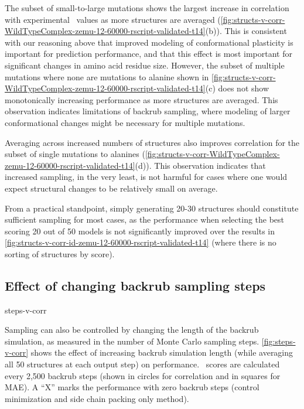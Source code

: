 The subset of small-to-large mutations shows the largest increase in correlation with experimental \ddg\ values as more structures are averaged (\cref{fig:structs-v-corr-WildTypeComplex-zemu-12-60000-rscript-validated-t14}(b)). This is consistent with our reasoning above that improved modeling of conformational plasticity is important for prediction performance, and that this effect is most important for significant changes in amino acid residue size. However, the subset of multiple mutations where none are mutations to alanine shown in \cref{fig:structs-v-corr-WildTypeComplex-zemu-12-60000-rscript-validated-t14}(c) does not show monotonically increasing performance as more structures are averaged. This observation indicates limitations of backrub sampling, where modeling of larger conformational changes might be necessary for multiple mutations.

Averaging across increased numbers of structures also improves correlation for the subset of single mutations to alanines (\cref{fig:structs-v-corr-WildTypeComplex-zemu-12-60000-rscript-validated-t14}(d)). This observation indicates that increased sampling, in the very least, is not harmful for cases where one would expect structural changes to be relatively small on average.

From a practical standpoint, simply generating 20-30 structures should constitute sufficient sampling for most cases, as the performance when selecting the best scoring 20 out of 50 models is not significantly improved over the results in \cref{fig:structs-v-corr-id-zemu-12-60000-rscript-validated-t14} (where there is no sorting of structures by score).

\subsection{Effect of changing backrub sampling steps}

{steps-v-corr}

Sampling can also be controlled by changing the length of the backrub simulation, as measured in the number of Monte Carlo sampling steps.
\cref{fig:steps-v-corr} shows the effect of increasing backrub simulation length (while averaging all 50 structures at each output step) on performance.
\ddg\ scores are calculated every 2,500 backrub steps (shown in circles for correlation and in squares for MAE).
A ``X'' marks the performance with zero backrub steps (control minimization and side chain packing only method).

